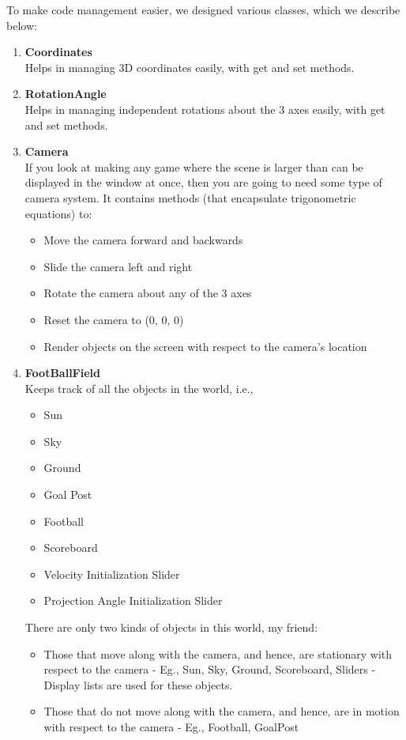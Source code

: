 \documentclass[12pt]{article} %
\begin{document}
To make code management easier, we designed various classes, which we describe below:\\
\begin{enumerate}
\item{\textbf{Coordinates}}\\
Helps in managing 3D coordinates easily, with get and set methods. 

\item{\textbf{RotationAngle}}\\
Helps in managing independent rotations about the 3 axes easily, with get and set methods. 

\item{\textbf{Camera}}\\
If you look at making any game where the scene is larger than can be displayed in the window at once, then you are going to need some type of camera system. It contains methods (that encapsulate trigonometric equations) to:
\begin{itemize}
\item{Move the camera forward and backwards} 
\item{Slide the camera left and right}
\item{Rotate the camera about any of the 3 axes}
\item{Reset the camera to (0, 0, 0)}
\item{Render objects on the screen with respect to the camera's location}
\end{itemize}

\item{\textbf{FootBallField}}\\
Keeps track of all the objects in the world, i.e., 
\begin{itemize}
\item{Sun} 
\item{Sky}
\item{Ground}
\item{Goal Post}
\item{Football}
\item{Scoreboard}
\item{Velocity Initialization Slider}
\item{Projection Angle Initialization Slider}
\end{itemize}

There are only two kinds of objects in this world, my friend:
\begin{itemize}
\item{Those that move along with the camera, and hence, are stationary with respect to the camera - Eg., Sun, Sky, Ground, Scoreboard, Sliders - Display lists are used for these objects.}
\item{Those that do not move along with the camera, and hence, are in motion with respect to the camera - Eg., Football, GoalPost}
\end{itemize}


\end{enumerate}
\end{document}
